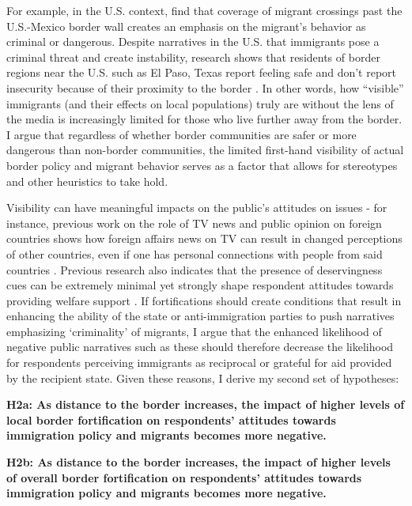 \documentclass[12pt,]{article}
\begin{document}
For example, in the U.S. context, \citet{jaramillo-dent2021} find that
coverage of migrant crossings past the U.S.-Mexico border wall creates
an emphasis on the migrant's behavior as criminal or dangerous. Despite
narratives in the U.S. that immigrants pose a criminal threat and create
instability, research shows that residents of border regions near the
U.S. such as El Paso, Texas report feeling safe and don't report
insecurity because of their proximity to the border
\citep{castaneda2020}. In other words, how ``visible'' immigrants (and
their effects on local populations) truly are without the lens of the
media is increasingly limited for those who live further away from the
border. I argue that regardless of whether border communities are safer
or more dangerous than non-border communities, the limited first-hand
visibility of actual border policy and migrant behavior serves as a
factor that allows for stereotypes and other heuristics to take hold.

Visibility can have meaningful impacts on the public's attitudes on
issues - for instance, previous work on the role of TV news and public
opinion on foreign countries shows how foreign affairs news on TV can
result in changed perceptions of other countries, even if one has
personal connections with people from said countries
\citep{semetko1992}. Previous research also indicates that the presence
of deservingness cues can be extremely minimal yet strongly shape
respondent attitudes towards providing welfare support
\citep{aaroe2014}. If fortifications should create conditions that
result in enhancing the ability of the state or anti-immigration parties
to push narratives emphasizing `criminality' of migrants, I argue that
the enhanced likelihood of negative public narratives such as these
should therefore decrease the likelihood for respondents perceiving
immigrants as reciprocal or grateful for aid provided by the recipient
state. Given these reasons, I derive my second set of hypotheses:

\textbf{H2a: As distance to the border increases, the impact of higher
levels of local border fortification on respondents' attitudes towards
immigration policy and migrants becomes more negative.}

\textbf{H2b: As distance to the border increases, the impact of higher
levels of overall border fortification on respondents' attitudes towards
immigration policy and migrants becomes more negative.}
\end{document}
